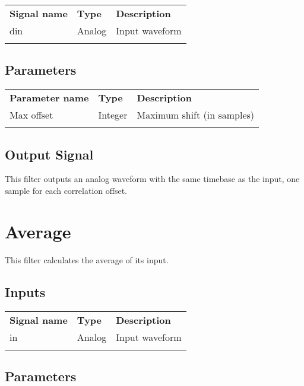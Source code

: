 \begin{tabularx}{16cm}{llX}
\thickhline
\textbf{Signal name} & \textbf{Type} & \textbf{Description} \\
\thickhline
din & Analog & Input waveform \\
\thickhline
\end{tabularx}

\subsection{Parameters}

\begin{tabularx}{16cm}{llX}
\thickhline
\textbf{Parameter name} & \textbf{Type} & \textbf{Description} \\
\thickhline
Max offset & Integer & Maximum shift (in samples)\\
\thickhline
\end{tabularx}

\subsection{Output Signal}

This filter outputs an analog waveform with the same timebase as the input, one sample for each correlation offset.

\pagebreak
\section{Average}
\label{filter:average}

This filter calculates the average of its input.

\subsection{Inputs}
\begin{tabularx}{16cm}{llX}
\thickhline
\textbf{Signal name} & \textbf{Type} & \textbf{Description} \\
\thickhline
in & Analog & Input waveform \\
\thickhline
\end{tabularx}

\subsection{Parameters}


